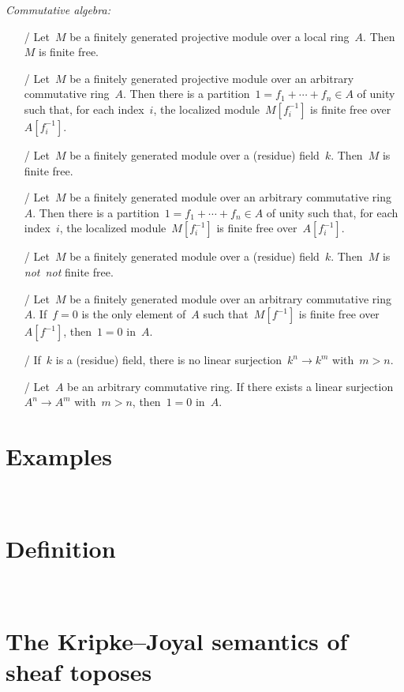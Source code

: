 \documentclass[10pt,reqno,a4paper,openany]{amsbook}
\newcommand{\cmark}{\ding{51}}
\newcommand{\xmark}{\ding{55}}
\theoremstyle{definition}
\theoremstyle{plain}
\theoremstyle{remark}
\newcommand{\?}{\,{:}\,}
\renewcommand{\_}{\mathpunct{.}\,}
\newcommand{\notnot}{\emph{not~not}\xspace}
\begin{document}
\emph{Commutative algebra:}
\begin{enumerate}
\item[\cmark/\cmark] Let~$M$ be a finitely generated projective module over a local
ring~$A$. Then~$M$ is finite free.
\item[\cmark/\cmark] Let~$M$ be a finitely generated projective module over an
arbitrary commutative ring~$A$. Then there is a partition~$1 = f_1 + \cdots +
f_n \in A$ of unity such that, for each index~$i$, the localized
module~$M[f_i^{-1}]$ is finite free over~$A[f_i^{-1}]$.
\item[\cmark/\xmark] Let~$M$ be a finitely generated module over a (residue)
field~$k$. Then~$M$ is finite free.
\item[\xmark/\xmark] Let~$M$ be a finitely generated module over an
arbitrary commutative ring~$A$. Then there is a partition~$1 = f_1 + \cdots +
f_n \in A$ of unity such that, for each index~$i$, the localized
module~$M[f_i^{-1}]$ is finite free over~$A[f_i^{-1}]$.
\item[\cmark/\cmark] Let~$M$ be a finitely generated module over a (residue)
field~$k$. Then~$M$ is \notnot finite free.
\item[\cmark/\cmark] Let~$M$ be a finitely generated module over an
arbitrary commutative ring~$A$. If~$f = 0$ is the only element of~$A$ such
that~$M[f^{-1}]$ is finite free over~$A[f^{-1}]$, then~$1 = 0$ in~$A$.
\item[\cmark/\cmark] If~$k$ is a (residue) field, there is no linear
surjection~$k^n \to k^m$ with~$m > n$.
\item[\cmark/\cmark] Let~$A$ be an arbitrary commutative ring. If there exists
a linear surjection~$A^n \to A^m$ with~$m > n$, then~$1 = 0$ in~$A$.
\end{enumerate}

\section{Examples}
\newpage
\ \newpage

\section{Definition}
\newpage
\ \newpage

\section{The Kripke--Joyal semantics of sheaf toposes}
\newpage
\ \newpage
\end{document}

